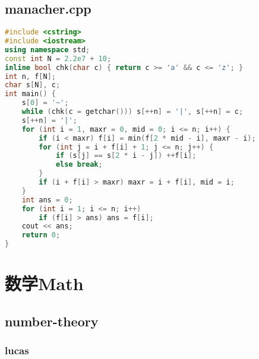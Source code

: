 \documentclass[9pt, a4paper, oneside]{book}
\begin{document}
\section{manacher.cpp}
\begin{lstlisting}[language={C++}]
#include <cstring>
#include <iostream>
using namespace std;
const int N = 2.2e7 + 10;
inline bool chk(char c) { return c >= 'a' && c <= 'z'; }
int n, f[N];
char s[N], c;
int main() {
    s[0] = '~';
    while (chk(c = getchar())) s[++n] = '|', s[++n] = c;
    s[++n] = '|';
    for (int i = 1, maxr = 0, mid = 0; i <= n; i++) {
        if (i < maxr) f[i] = min(f[2 * mid - i], maxr - i);
        for (int j = i + f[i] + 1; j <= n; j++) {
            if (s[j] == s[2 * i - j]) ++f[i];
            else break;
        }
        if (i + f[i] > maxr) maxr = i + f[i], mid = i;
    }
    int ans = 0;
    for (int i = 1; i <= n; i++)
        if (f[i] > ans) ans = f[i];
    cout << ans;
    return 0;
}\end{lstlisting}
\chapter{数学Math}
\section{number-theory}
\subsection{lucas}
\end{document}
